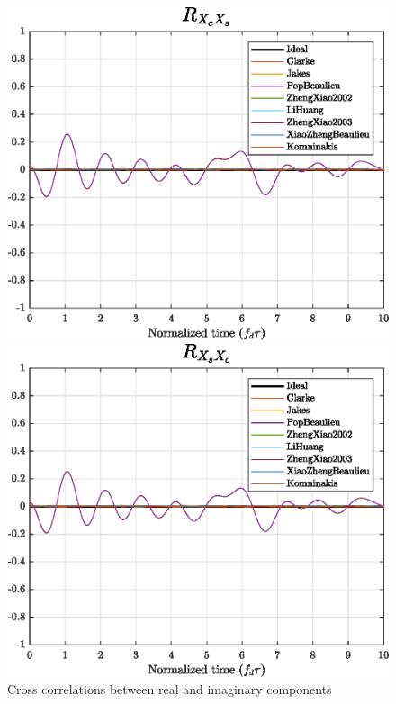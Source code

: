 \begin{figure}
	\vspace{2mm}
	
	\hfill
	\begin{minipage}{.45\linewidth}
		\includegraphics[width=\linewidth]{img/XcXs.eps}
	\end{minipage}
	\hfill
	\begin{minipage}{.45\linewidth}
		\includegraphics[width=\linewidth]{img/XsXc.eps}
	\end{minipage}
	\hfill
	
	\caption{Cross correlations between real and imaginary components}
	\label{fig:4xcorr}
\end{figure}

